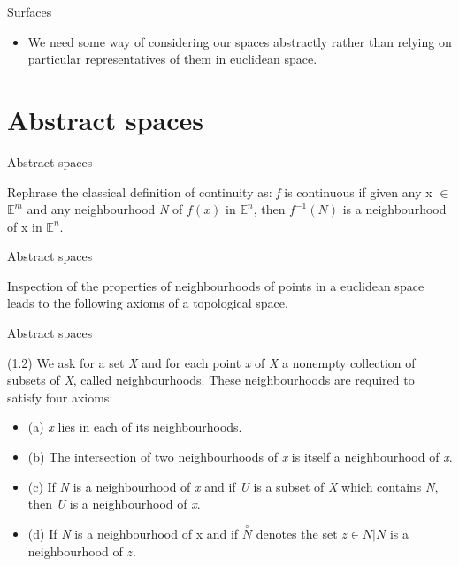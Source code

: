 \documentclass{beamer}
\begin{document}
\begin{frame}{Surfaces}
  \begin{block}{}
    \begin{itemize}
    \item We need some way of considering our spaces abstractly rather than relying on particular representatives of them in euclidean space.
    \end{itemize}
  \end{block}
\end{frame}

\section{Abstract spaces}

\begin{frame}{Abstract spaces}
  \begin{block}{}
    Rephrase the classical definition of continuity as: \textsl{f} is continuous if given any x $\in$ $\mathbb{E}^m$ and any neighbourhood \textsl{N} of $f(x)$ in $\mathbb{E}^n$, then $f^{-1}(N)$ is a neighbourhood of x in $\mathbb{E}^n$.
  \end{block}
\end{frame}

\begin{frame}{Abstract spaces}
  \begin{block}{}
    Inspection of the properties of neighbourhoods of points in a euclidean space leads to the following axioms of a topological space.
  \end{block}
\end{frame}

\begin{frame}{Abstract spaces}
  \begin{block}{}
    (1.2) We ask for a set \textsl{X} and for each point \textsl{x} of \textsl{X} a nonempty collection of subsets of \textsl{X}, called neighbourhoods. These neighbourhoods are required to satisfy four axioms:
    \begin{itemize}
    \item (a) \textsl{x} lies in each of its neighbourhoods.
    \item (b) The intersection of two neighbourhoods of \textsl{x} is itself a neighbourhood of \textsl{x}.
    \item (c) If \textsl{N} is a neighbourhood of \textsl{x} and if \textsl{U} is a subset of \textsl{X} which contains \textsl{N}, then \textsl{U} is a neighbourhood of \textsl{x}.
    \item (d) If \textsl{N} is a neighbourhood of x and if $\overset{\circ}{N}$ denotes the set {{$z \in N|N$ is a neighbourhood of $z$}}.
    \end{itemize}
  \end{block}
\end{frame}
\end{document}
